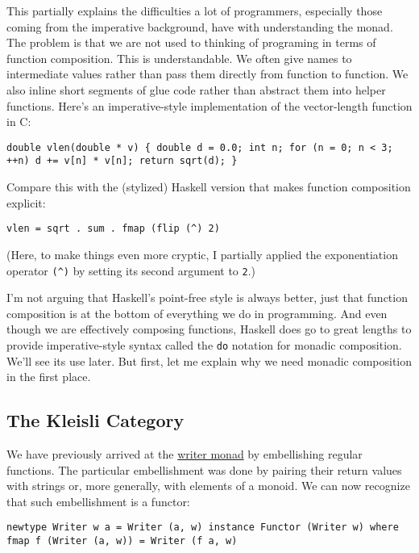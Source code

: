 This partially explains the difficulties a lot of programmers,
especially those coming from the imperative background, have with
understanding the monad. The problem is that we are not used to thinking
of programing in terms of function composition. This is understandable.
We often give names to intermediate values rather than pass them
directly from function to function. We also inline short segments of
glue code rather than abstract them into helper functions. Here's an
imperative-style implementation of the vector-length function in C:

\begin{verbatim}
double vlen(double * v) { double d = 0.0; int n; for (n = 0; n < 3; ++n) d += v[n] * v[n]; return sqrt(d); }
\end{verbatim}

Compare this with the (stylized) Haskell version that makes function
composition explicit:

\begin{verbatim}
vlen = sqrt . sum . fmap (flip (^) 2)
\end{verbatim}

(Here, to make things even more cryptic, I partially applied the
exponentiation operator \texttt{(\^{})} by setting its second argument
to \texttt{2}.)

I'm not arguing that Haskell's point-free style is always better, just
that function composition is at the bottom of everything we do in
programming. And even though we are effectively composing functions,
Haskell does go to great lengths to provide imperative-style syntax
called the \texttt{do} notation for monadic composition. We'll see its
use later. But first, let me explain why we need monadic composition in
the first place.

\subsection{The Kleisli Category}\label{the-kleisli-category}

We have previously arrived at the
\href{https://bartoszmilewski.com/2014/12/23/kleisli-categories/}{writer
monad} by embellishing regular functions. The particular embellishment
was done by pairing their return values with strings or, more generally,
with elements of a monoid. We can now recognize that such embellishment
is a functor:

\begin{verbatim}
newtype Writer w a = Writer (a, w) instance Functor (Writer w) where fmap f (Writer (a, w)) = Writer (f a, w)
\end{verbatim}

